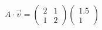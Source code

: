 \documentclass[preview]{standalone}
\begin{document}
\begin{align*}
A \cdot \vec{v} = \begin{pmatrix} 2 & 1 \\ 1 & 2 \end{pmatrix} \begin{pmatrix} 1.5 \\ 1 \end{pmatrix}
\end{align*}
\end{document}
